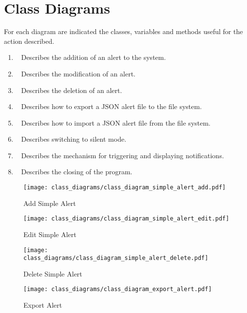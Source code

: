 \chapter{Class Diagrams}\label{ch:class_diagrams}
For each diagram are indicated the classes, variables and methods useful for the action described.\\
\begin{enumerate}
    \item~ Describes the addition of an alert to the system.
    \item~ Describes the modification of an alert.
    \item~ Describes the deletion of an alert.
    \item~ Describes how to export a JSON alert file to the file system.
    \item~ Describes how to import a JSON alert file from the file system.
    \item~ Describes switching to silent mode.
    \item~ Describes the mechanism for triggering and displaying notifications.
    \item~ Describes the closing of the program.
\end{enumerate}

\begin{figure}[]
	\centering
    \caption{Add Simple Alert}\label{fig:cls_simple_alert_add}
    \texttt{[image: class\_diagrams/class\_diagram\_simple\_alert\_add.pdf]}
\end{figure}

\begin{figure}[]
	\centering
    \caption{Edit Simple Alert}\label{fig:cls_simple_alert_edit}
    \texttt{[image: class\_diagrams/class\_diagram\_simple\_alert\_edit.pdf]}
\end{figure}

\begin{figure}[]
	\centering
    \caption{Delete Simple Alert}\label{fig:cls_simple_alert_delete}
    \texttt{[image: class\_diagrams/class\_diagram\_simple\_alert\_delete.pdf]}
\end{figure}

\begin{figure}[]
	\centering
    \caption{Export Alert}\label{fig:cls_export_alert}
    \texttt{[image: class\_diagrams/class\_diagram\_export\_alert.pdf]}
\end{figure}

